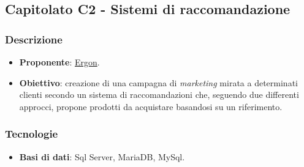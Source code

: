 \subsection{Capitolato C2 - Sistemi di raccomandazione}


\subsubsection{Descrizione}
\begin{itemize}
    \item \textbf{Proponente}: \href{https://www.ergon.it/}{Ergon}.
    \item \textbf{Obiettivo}: creazione di una campagna di \textit{marketing} mirata a determinati clienti secondo un sistema di raccomandazioni che, seguendo due differenti approcci, propone prodotti da acquistare basandosi su un riferimento.
\end{itemize}


\subsubsection{Tecnologie}
\begin{itemize}
    \item \textbf{Basi di dati}: Sql Server, MariaDB, MySql.
\end{itemize}


